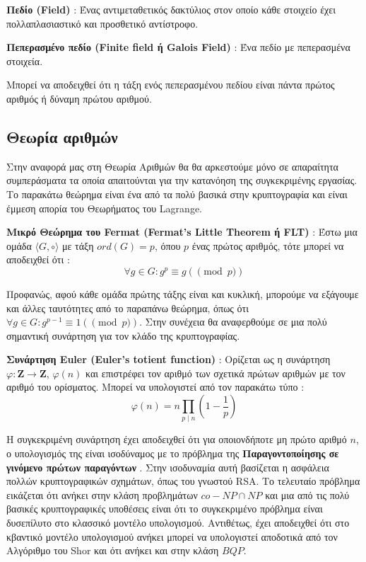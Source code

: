 \begin{definition}
\textbf{Πεδίο (Field)} : Ένας αντιμεταθετικός δακτύλιος στον οποίο κάθε στοιχείο έχει πολλαπλασιαστικό και προσθετικό αντίστροφο.
\end{definition}

\begin{definition}
\textbf{Πεπερασμένο πεδίο (Finite field ή Galois Field)} : Ένα πεδίο με πεπερασμένα στοιχεία.
\end{definition}

Μπορεί να αποδειχθεί ότι η τάξη ενός πεπερασμένου πεδίου είναι πάντα πρώτος αριθμός ή δύναμη πρώτου αριθμού. 

\subsection{Θεωρία αριθμών}

Στην αναφορά μας στη Θεωρία Αριθμών θα θα αρκεστούμε μόνο σε απαραίτητα συμπεράσματα τα οποία απαιτούνται για την κατανόηση της συγκεκριμένης εργασίας. Το παρακάτω θεώρημα είναι ένα από τα πολύ βασικά στην κρυπτογραφία και είναι έμμεση απορία του Θεωρήματος του Lagrange.

\begin{definition}
\textbf{Μικρό Θεώρημα του Fermat (Fermat's Little Theorem ή FLT)} :  Έστω μια ομάδα $\langle G, \circ \rangle$ με τάξη  $ord(G)=p$, όπου $p$ ένας πρώτος αριθμός, τότε μπορεί να αποδειχθεί ότι :
$$
\forall g \in G : g^{p} \equiv g (\pmod p)
$$
\end{definition}

Προφανώς, αφού κάθε ομάδα πρώτης τάξης είναι και κυκλική, μπορούμε να εξάγουμε και άλλες ταυτότητες από το παραπάνω θεώρημα, όπως ότι $\forall g \in G : g^{p-1} \equiv 1 (\pmod p)$. Στην συνέχεια θα αναφερθούμε σε μια πολύ σημαντική συνάρτηση για τον κλάδο της κρυπτογραφίας.

\begin{definition}
\textbf{Συνάρτηση Euler (Euler's totient function)} :  Ορίζεται ως η συνάρτηση $φ: \mathbf{Z} \rightarrow \mathbf{Z}$, $φ(n)$ και επιστρέφει τον αριθμό των σχετικά πρώτων αριθμών με τον αριθμό του ορίσματος. Μπορεί να υπολογιστεί από τον παρακάτω τύπο :
$$
φ(n)=n\prod_{p\mid n}\left(1-{\frac {1}{p}}\right)
$$
\end{definition}

Η συγκεκριμένη συνάρτηση έχει αποδειχθεί ότι για οποιονδήποτε μη πρώτο αριθμό $n$, ο υπολογισμός της είναι ισοδύναμος με το πρόβλημα της \textbf{Παραγοντοποίησης σε γινόμενο πρώτων παραγόντων} \cite{miller1976riemann}. Στην ισοδυναμία αυτή βασίζεται η ασφάλεια πολλών κρυπτογραφικών σχημάτων, όπως του γνωστού RSA. Το τελευταίο πρόβλημα εικάζεται ότι ανήκει στην κλάση προβλημάτων $co-NP \cap NP$ και μια από τις πολύ βασικές κρυπτογραφικές υποθέσεις είναι ότι το συγκεκριμένο πρόβλημα είναι δυσεπίλυτο στο κλασσικό μοντέλο υπολογισμού. Αντιθέτως, έχει αποδειχθεί ότι στο κβαντικό μοντέλο υπολογισμού ανήκει μπορεί να υπολογιστεί αποδοτικά από τον Αλγόριθμο του Shor και ότι ανήκει και στην κλάση $BQP$. 

